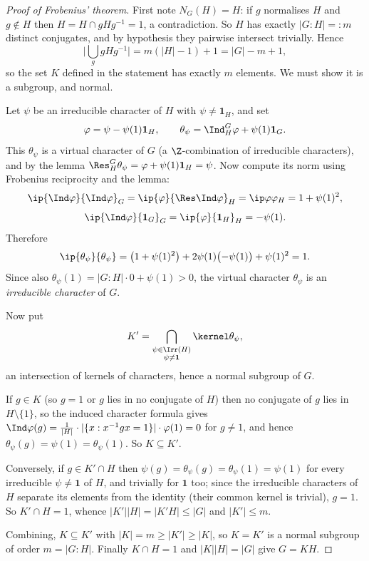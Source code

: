 \begin{proof}[Proof of Frobenius' theorem]
	First note $N_G(H) = H$: if $g$ normalises $H$ and $g\notin H$ then $H = H\cap gHg^{-1} = 1$, a contradiction. So $H$ has exactly $|G:H| =: m$ distinct conjugates, and by hypothesis they pairwise intersect trivially. Hence
	$$\Big|\bigcup_g gHg^{-1}\Big| = m(|H|-1) + 1 = |G| - m + 1,$$
	so the set $K$ defined in the statement has exactly $m$ elements. We must show it is a subgroup, and normal.

	Let $\psi$ be an irreducible character of $H$ with $\psi\neq\mathbf 1_H$, and set
	$$\varphi = \psi - \psi(1)\mathbf 1_H, \qquad \theta_\psi = \Ind_H^G\varphi + \psi(1)\mathbf 1_G.$$
	This $\theta_\psi$ is a virtual character of $G$ (a $\Z$-combination of irreducible characters), and by the lemma $\Res^G_H\theta_\psi = \varphi + \psi(1)\mathbf 1_H = \psi$. Now compute its norm using Frobenius reciprocity and the lemma:
	$$\ip{\Ind\varphi}{\Ind\varphi}_G = \ip{\varphi}{\Res\Ind\varphi}_H = \ip\varphi\varphi_H = 1 + \psi(1)^2,$$
	$$\ip{\Ind\varphi}{\mathbf 1_G}_G = \ip{\varphi}{\mathbf 1_H}_H = -\psi(1).$$
	Therefore
	$$\ip{\theta_\psi}{\theta_\psi} = \big(1+\psi(1)^2\big) + 2\psi(1)\big({-\psi(1)}\big) + \psi(1)^2 = 1.$$
	Since also $\theta_\psi(1) = |G:H|\cdot 0 + \psi(1) > 0$, the virtual character $\theta_\psi$ is an \emph{irreducible character} of $G$.

	Now put
	$$K' = \bigcap_{\substack{\psi\in\Irr(H)\\ \psi\neq\mathbf1}}\kernel\theta_\psi,$$
	an intersection of kernels of characters, hence a normal subgroup of $G$.

	If $g \in K$ (so $g = 1$ or $g$ lies in no conjugate of $H$) then no conjugate of $g$ lies in $H\setminus\{1\}$, so the induced character formula gives $\Ind\varphi(g) = \frac{1}{|H|}\cdot|\{x : x^{-1}gx = 1\}|\cdot\varphi(1) = 0$ for $g\neq 1$, and hence $\theta_\psi(g) = \psi(1) = \theta_\psi(1)$. So $K\subseteq K'$.

	Conversely, if $g \in K'\cap H$ then $\psi(g) = \theta_\psi(g) = \theta_\psi(1) = \psi(1)$ for every irreducible $\psi\neq\mathbf1$ of $H$, and trivially for $\mathbf 1$ too; since the irreducible characters of $H$ separate its elements from the identity (their common kernel is trivial), $g = 1$. So $K'\cap H = 1$, whence $|K'||H| = |K'H|\leq|G|$ and $|K'|\leq m$.

	Combining, $K\subseteq K'$ with $|K| = m \geq |K'| \geq |K|$, so $K = K'$ is a normal subgroup of order $m = |G:H|$. Finally $K\cap H = 1$ and $|K||H| = |G|$ give $G = KH$.
\end{proof}

